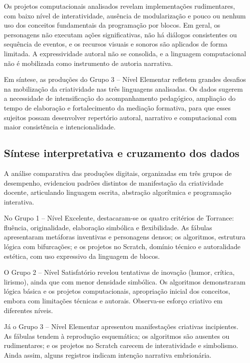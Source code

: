 \documentclass[portuguese]{textolivre}
\begin{document}
Os projetos computacionais analisados revelam implementações rudimentares, com baixo nível de interatividade, ausência de modularização e pouco ou nenhum uso dos conceitos fundamentais da programação por blocos. Em geral, os personagens não executam ações significativas, não há diálogos consistentes ou sequência de eventos, e os recursos visuais e sonoros são aplicados de forma limitada. A expressividade autoral não se consolida, e a linguagem computacional não é mobilizada como instrumento de autoria narrativa.

Em síntese, as produções do Grupo 3 – Nível Elementar refletem grandes desafios na mobilização da criatividade nas três linguagens analisadas. Os dados sugerem a necessidade de intensificação do acompanhamento pedagógico, ampliação do tempo de elaboração e fortalecimento da mediação formativa, para que esses sujeitos possam desenvolver repertório autoral, narrativo e computacional com maior consistência e intencionalidade.

\subsection{Síntese interpretativa e cruzamento dos dados}

A análise comparativa das produções digitais, organizadas em três grupos de desempenho, evidenciou padrões distintos de manifestação da criatividade docente, articulando linguagem escrita, abstração algorítmica e programação interativa.

No Grupo 1 – Nível Excelente, destacaram-se os quatro critérios de Torrance: fluência, originalidade, elaboração simbólica e flexibilidade. As fábulas apresentaram metáforas inventivas e personagens densos; os algoritmos, estrutura lógica com bifurcações; e os projetos no Scratch, domínio técnico e autoralidade estética, com uso expressivo da linguagem de blocos.

O Grupo 2 – Nível Satisfatório revelou tentativas de inovação (humor, crítica, lirismo), ainda que com menor densidade simbólica. Os algoritmos demonstraram lógica básica e os projetos computacionais, apropriação inicial dos conceitos, embora com limitações técnicas e autorais. Observa-se esforço criativo em diferentes níveis.

Já o Grupo 3 – Nível Elementar apresentou manifestações criativas incipientes. As fábulas tendem à reprodução esquemática; os algoritmos são ausentes ou rudimentares; e os projetos no Scratch carecem de interatividade e simbolismo. Ainda assim, alguns registros indicam intenção narrativa embrionária.
\end{document}
